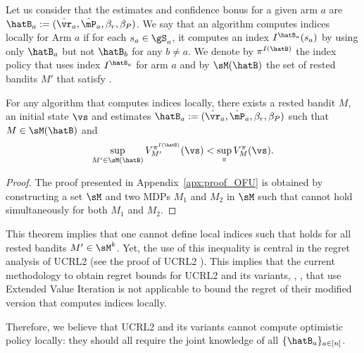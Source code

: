 Let us consider that the estimates and confidence bonus for a given arm $a$ are $\hatB_a:=(\hat{\vr}_a,\hat{\mP}_a,\beta_{r},\beta_{P})$. We say that an algorithm computes indices locally for Arm $a$ if for each $s_a\in\gS_a$, it computes an index $I^{\hatB_a}(s_a)$ by using only $\hatB_a$ but not $\hatB_{b}$ for any $b\ne a$. We denote by $\pi^{I(\hatB)}$ the index policy that uses index $I^{\hatB_a}$ for arm $a$ and by $\sM(\hatB)$ the set of rested bandits $M'$ that satisfy .
\begin{thm}
    \label{thm:no_OFU}
    For any algorithm that computes indices locally, there exists a rested bandit $M$, an initial state $\vs$ and estimates $\hatB_a:=(\hat{\vr}_a,\hat{\mP}_a, \beta_r, \beta_P)$ such that $M\in\sM(\hatB)$ and
    \begin{align*}
        \sup_{M'\in\sM(\hatB)}V^{\pi^{I(\hatB)}}_{M'}(\vs) < \sup_\pi V^{\pi}_{M}(\vs).
    \end{align*}
\end{thm}
\begin{proof}
    The proof presented in Appendix~\ref{apx:proof_OFU} is obtained by constructing a set $\sM$ and two MDPs $M_1$ and $M_2$ in $\sM$ such that  cannot hold simultaneously for both $M_1$ and $M_2$. 
\end{proof}
This theorem implies that one cannot define local indices such that  holds for all rested bandits $M'\in\sM^k$. Yet, the use of this inequality is central in the regret analysis of UCRL2 (see the proof of UCRL2 \cite{jaksch2010near}). This implies that the current methodology to obtain regret bounds for UCRL2 and its variants, \eg, \cite{bourel2020tightening,fruit2018efficient,talebi2018variance,filippi2010optimism}, that use Extended Value Iteration is not applicable to bound the regret of their modified version that computes indices locally. 

Therefore, we  believe that UCRL2 and its variants cannot compute optimistic  policy locally: they should all require the joint knowledge of all $\{\hatB_a\}_{a\in[n]}$.


